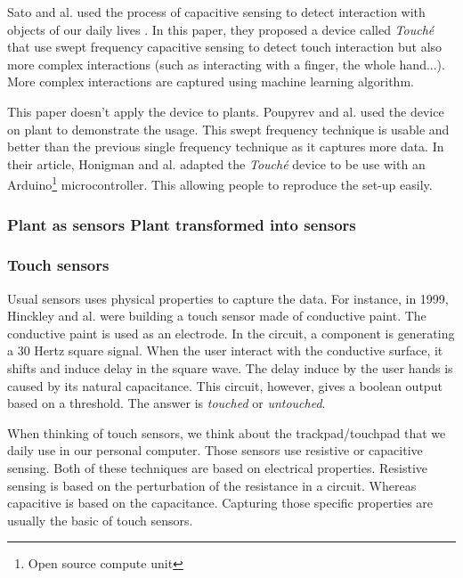 Sato and al. used the process of capacitive sensing to detect interaction with objects of our daily lives \cite{satoToucheEnhancingTouch2012}.
In this paper, they proposed a device called \textit{Touché} that use swept frequency capacitive sensing  to detect touch interaction 
but also more complex interactions (such as interacting with a finger, the whole hand...). More complex 
interactions are captured using machine learning algorithm.

This paper doesn't apply the device to plants. Poupyrev and al. \cite{poupyrevBotanicusInteracticusInteractive2012}
used the device on plant to demonstrate the usage. This swept frequency technique is usable and better
than the previous single frequency technique as it captures more data.
In their article, Honigman and al. \cite{honigmanTechniquesSweptFrequencyb} adapted the \textit{Touché}
device to be use with an Arduino\footnote{Open source compute unit} microcontroller. This allowing people
to reproduce the set-up easily.


\subsubsection{Plant as sensors Plant transformed into sensors}

\subsubsection{Touch sensors}

Usual sensors uses physical properties to capture the data. For instance, in 1999, Hinckley and al. \cite{hinckleyTouchsensingInputDevices1999} 
were building a touch sensor made of conductive paint. The conductive paint is used as an electrode.
In the circuit, a component is generating a 30 Hertz square signal. When the user interact with the conductive surface,
it shifts and induce delay in the square wave. The delay induce by the user hands is caused by its natural
capacitance. This circuit, however, gives a boolean output based on a threshold. The answer is \textit{touched}
or \textit{untouched}. %

When thinking of touch sensors, we think about the trackpad/touchpad that we daily use in our personal 
computer. Those sensors use resistive or capacitive sensing. Both of these techniques are based on electrical
properties. Resistive sensing is based on the perturbation of the resistance in a circuit. Whereas 
capacitive is based on the capacitance. Capturing those specific properties are usually the basic of 
touch sensors.

